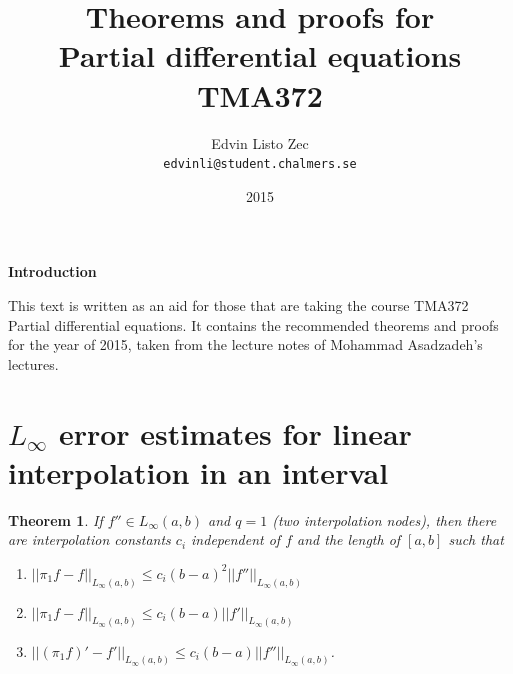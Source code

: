 \documentclass[12pt, a4paper]{article}
\title{Theorems and proofs for \\ Partial differential equations \\ TMA372}
\author{Edvin Listo Zec \\ \texttt{edvinli@student.chalmers.se}}
\date{2015}
\newtheorem{theorem}{Theorem}[section]
\numberwithin{equation}{section}
\begin{document}
\maketitle
{}
\thispagestyle{empty}
\centerline{\textbf{Introduction}}
\noindent This text is written as an aid for those that are taking the course TMA372 Partial differential equations. It contains the recommended theorems and proofs for the year of 2015, taken from the lecture notes of Mohammad Asadzadeh's lectures.
\newline
 \newline
 
\newpage
\tableofcontents
\thispagestyle{empty}
\newpage
\setcounter{page}{1}
\section{$L_\infty$ error estimates for linear interpolation in an interval}
\begin{theorem}
If $f''\in L_\infty(a,b)$ and $q=1$ (two interpolation nodes), then there are interpolation constants $c_i$ independent of $f$ and the length of $[a,b]$ such that

\begin{enumerate}[label={(\roman*)}]
    \item $||\pi_1 f - f||_{L_{\infty}(a,b)} \leq c_i (b-a)^2 ||f''||_{L_\infty(a,b)}$
    \item $||\pi_1 f - f||_{L_\infty (a,b)}\leq c_i (b-a) ||f'||_{L_\infty (a,b)}$
    \item $|| (\pi_1 f)' - f'||_{L_\infty (a,b)}\leq c_i(b-a)|| f''||_{L_\infty (a,b)}$.
\end{enumerate}
\end{theorem}
\end{document}
